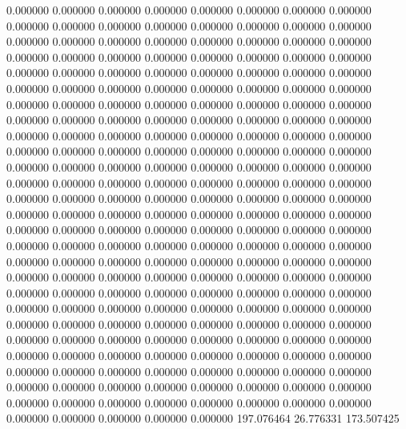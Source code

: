 0.000000 0.000000 0.000000
0.000000 0.000000 0.000000
0.000000 0.000000 0.000000
0.000000 0.000000 0.000000
0.000000 0.000000 0.000000
0.000000 0.000000 0.000000
0.000000 0.000000 0.000000
0.000000 0.000000 0.000000
0.000000 0.000000 0.000000
0.000000 0.000000 0.000000
0.000000 0.000000 0.000000
0.000000 0.000000 0.000000
0.000000 0.000000 0.000000
0.000000 0.000000 0.000000
0.000000 0.000000 0.000000
0.000000 0.000000 0.000000
0.000000 0.000000 0.000000
0.000000 0.000000 0.000000
0.000000 0.000000 0.000000
0.000000 0.000000 0.000000
0.000000 0.000000 0.000000
0.000000 0.000000 0.000000
0.000000 0.000000 0.000000
0.000000 0.000000 0.000000
0.000000 0.000000 0.000000
0.000000 0.000000 0.000000
0.000000 0.000000 0.000000
0.000000 0.000000 0.000000
0.000000 0.000000 0.000000
0.000000 0.000000 0.000000
0.000000 0.000000 0.000000
0.000000 0.000000 0.000000
0.000000 0.000000 0.000000
0.000000 0.000000 0.000000
0.000000 0.000000 0.000000
0.000000 0.000000 0.000000
0.000000 0.000000 0.000000
0.000000 0.000000 0.000000
0.000000 0.000000 0.000000
0.000000 0.000000 0.000000
0.000000 0.000000 0.000000
0.000000 0.000000 0.000000
0.000000 0.000000 0.000000
0.000000 0.000000 0.000000
0.000000 0.000000 0.000000
0.000000 0.000000 0.000000
0.000000 0.000000 0.000000
0.000000 0.000000 0.000000
0.000000 0.000000 0.000000
0.000000 0.000000 0.000000
0.000000 0.000000 0.000000
0.000000 0.000000 0.000000
0.000000 0.000000 0.000000
0.000000 0.000000 0.000000
0.000000 0.000000 0.000000
0.000000 0.000000 0.000000
0.000000 0.000000 0.000000
0.000000 0.000000 0.000000
0.000000 0.000000 0.000000
0.000000 0.000000 0.000000
0.000000 0.000000 0.000000
0.000000 0.000000 0.000000
0.000000 0.000000 0.000000
0.000000 0.000000 0.000000
0.000000 0.000000 0.000000
0.000000 0.000000 0.000000
0.000000 0.000000 0.000000
0.000000 0.000000 0.000000
0.000000 0.000000 0.000000
0.000000 0.000000 0.000000
0.000000 0.000000 0.000000
197.076464 26.776331 173.507425
